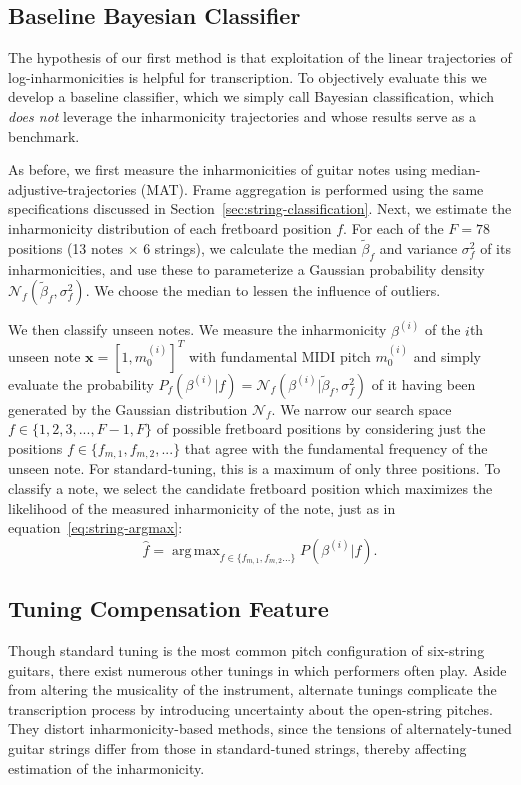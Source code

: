 \documentclass[convention,peer-reviewed]{aesconf}
\DeclareMathOperator*{\argmax}{arg\,max}
\begin{document}
\subsection{Baseline Bayesian Classifier}
The hypothesis of our first method is that exploitation of the linear trajectories of log-inharmonicities is helpful for transcription. To objectively evaluate this we develop a baseline classifier, which we simply call Bayesian classification, which \textit{does not} leverage the inharmonicity trajectories and whose results serve as a benchmark.

As before, we first measure the inharmonicities of guitar notes using median-adjustive-trajectories (MAT). Frame aggregation is performed using the same specifications discussed in Section~\ref{sec:string-classification}. Next, we estimate the inharmonicity distribution of each fretboard position $f$. For each of the $F=78$ positions (13 notes $\times$ 6 strings), we calculate the median $\tilde{\beta}_f$ and variance $\sigma^2_f$ of its inharmonicities, and use these to parameterize a Gaussian probability density $\mathcal{N}_f(\tilde{\beta}_f,\sigma^2_f)$. We choose the median to lessen the influence of outliers.

We then classify unseen notes. We measure the inharmonicity $\beta^{(i)}$ of the $i$th unseen note $\mathbf{x}=[1,m_0^{(i)}]^T$ with fundamental MIDI pitch $m_0^{(i)}$ and simply evaluate the probability $P_f(\beta^{(i)} | f) = \mathcal{N}_f(\beta^{(i)} | \tilde{\beta}_f,\sigma^2_f)$ of it having been generated by the Gaussian distribution $\mathcal{N}_f$. We narrow our search space $f \in \{1,2,3,...,F-1,F\}$ of possible fretboard positions by considering just the positions $f \in \{f_{m,1},f_{m,2},...\}$ that agree with the fundamental frequency of the unseen note. For standard-tuning, this is a maximum of only three positions. To classify a note, we select the candidate fretboard position which maximizes the likelihood of the measured inharmonicity of the note, just as in equation~\eqref{eq:string-argmax}:
\begin{equation}
\hat{f} = \argmax_{f\in\{f_{m,1},f_{m,2}...\}}P(\beta^{(i)} | f).
\label{eq:string-classification-mle}
\end{equation}


\subsection{Tuning Compensation Feature}
Though standard tuning is the most common pitch configuration of six-string guitars, there exist numerous other tunings in which performers often play. Aside from altering the musicality of the instrument, alternate tunings complicate the transcription process by introducing uncertainty about the open-string pitches. They distort inharmonicity-based methods, since the tensions of alternately-tuned guitar strings differ from those in standard-tuned strings, thereby affecting estimation of the inharmonicity. 
\end{document}
